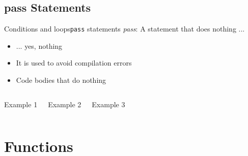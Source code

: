 \documentclass[10pt,compress]{beamer} %
\begin{document}
\subsection{pass Statements}
\begin{frame}{Conditions and loops}{\texttt{pass} statements}
	\textit{pass}: A statement that does nothing ...
		\begin{itemize}
		\item ... yes, nothing
		\item It is used to avoid compilation errors
		\item Code bodies that do nothing
		\end{itemize}
    \begin{columns}
		\begin{block}{Example 1}
		\vspace{-0.2cm}
		
		\vspace{-0.2cm}
		\end{block}

		\begin{block}{Example 2}
		\vspace{-0.2cm}
		
		\vspace{-0.2cm}
		\end{block}

		\begin{block}{Example 3}
		\vspace{-0.2cm}
		
		\vspace{-0.2cm}
		\end{block}
	\end{columns}
\end{frame}

\section{Functions}
\end{document}
